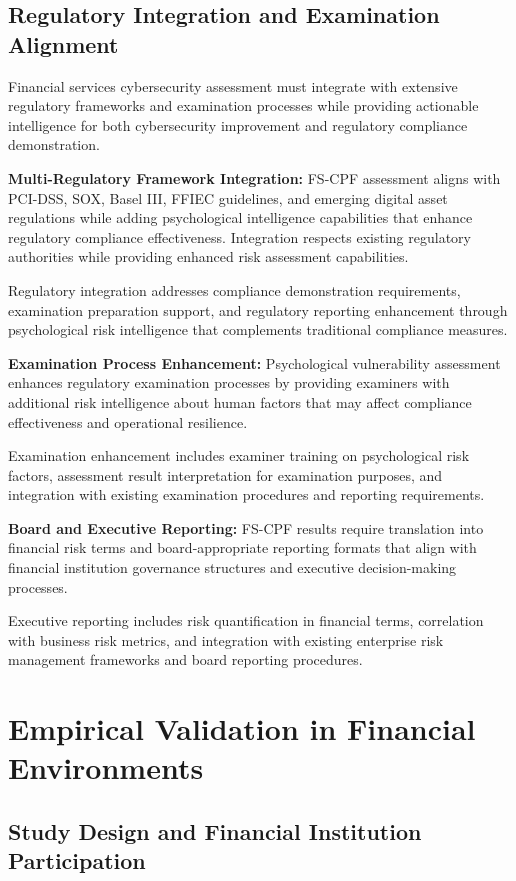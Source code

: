 \documentclass[10pt, twocolumn]{article}
\begin{document}
\subsection{Regulatory Integration and Examination Alignment}

Financial services cybersecurity assessment must integrate with extensive regulatory frameworks and examination processes while providing actionable intelligence for both cybersecurity improvement and regulatory compliance demonstration.

\textbf{Multi-Regulatory Framework Integration:} FS-CPF assessment aligns with PCI-DSS, SOX, Basel III, FFIEC guidelines, and emerging digital asset regulations while adding psychological intelligence capabilities that enhance regulatory compliance effectiveness. Integration respects existing regulatory authorities while providing enhanced risk assessment capabilities.

Regulatory integration addresses compliance demonstration requirements, examination preparation support, and regulatory reporting enhancement through psychological risk intelligence that complements traditional compliance measures.

\textbf{Examination Process Enhancement:} Psychological vulnerability assessment enhances regulatory examination processes by providing examiners with additional risk intelligence about human factors that may affect compliance effectiveness and operational resilience.

Examination enhancement includes examiner training on psychological risk factors, assessment result interpretation for examination purposes, and integration with existing examination procedures and reporting requirements.

\textbf{Board and Executive Reporting:} FS-CPF results require translation into financial risk terms and board-appropriate reporting formats that align with financial institution governance structures and executive decision-making processes.

Executive reporting includes risk quantification in financial terms, correlation with business risk metrics, and integration with existing enterprise risk management frameworks and board reporting procedures.

\section{Empirical Validation in Financial Environments}

\subsection{Study Design and Financial Institution Participation}
\end{document}
